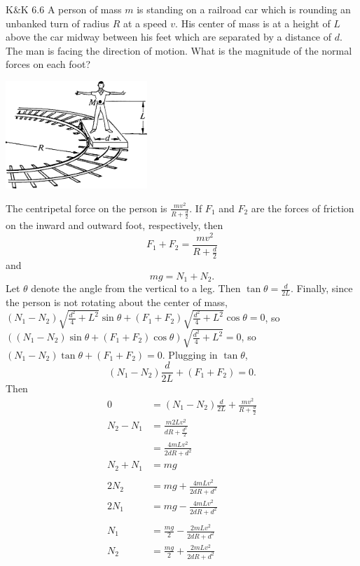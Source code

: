 \documentclass{esg8012pset}
\begin{document}
\begin{problem}{K\&K 6.6}
  A person of mass $m$ is standing on a railroad car which is rounding an unbanked turn of radius $R$ at a speed $v$. His center of mass is at a height of $L$ above the car midway between his feet which are separated by a distance of $d$. The man is facing the direction of motion. What is the magnitude of the normal forces on each foot?
  \begin{center}\includegraphics[width=0.4\textwidth]{ps08_3}\end{center}
\end{problem}
\begin{solution}
  The centripetal force on the person is $\frac{m v^2}{R + \frac{d}{2}}$.  If $F_1$ and $F_2$ are the forces of friction on the inward and outward foot, respectively, then $$F_1 + F_2 = \frac{m v^2}{R + \frac{d}{2}}$$ and $$m g = N_1 + N_2.$$  Let $\theta$ denote the angle from the vertical to a leg.  Then $\tan\theta = \frac{d}{2L}$.  Finally, since the person is not rotating about the center of mass, $(N_1 - N_2)\sqrt{\frac{d^2}{4} + L^2}\sin\theta + (F_1 + F_2)\sqrt{\frac{d^2}{4} + L^2}\cos\theta = 0$, so $((N_1 - N_2)\sin\theta + (F_1 + F_2)\cos\theta)\sqrt{\frac{d^2}{4} + L^2} = 0$, so $(N_1 - N_2)\tan\theta + (F_1 + F_2) = 0$.  Plugging in $\tan\theta$, $$(N_1 - N_2)\frac{d}{2L} + (F_1 + F_2) = 0.$$  Then \begin{align*}
  0 & = (N_1 - N_2)\frac{d}{2L} + \frac{m v^2}{R + \frac{d}{2}} \\
  N_2 - N_1 & = \frac{m 2L v^2}{d R + \frac{d^2}{2}} \\
    & = \frac{4 m L v^2}{2 d R + d^2} \\
  N_2 + N_1 & = m g \\
  \\
  2N_2 & = mg + \frac{4 m L v^2}{2 d R + d^2} \\
  2N_1 & = m g - \frac{4 m L v^2}{2 d R + d^2} \\
  \\
  N_1 & = \frac{m g}{2} - \frac{2 m L v^2}{2 d R + d^2} \\
  N_2 & = \frac{m g}{2} + \frac{2 m L v^2}{2 d R + d^2}
  \end{align*}
\end{solution}
\end{document}
